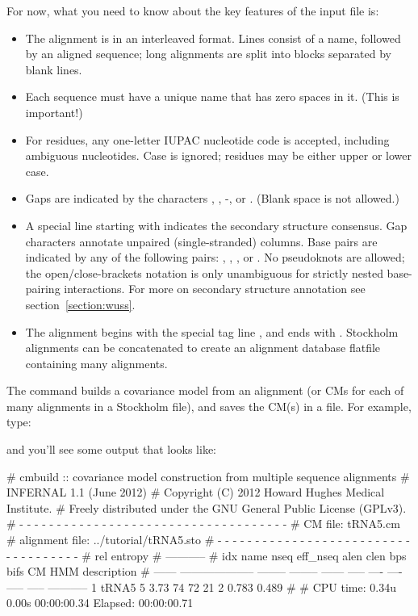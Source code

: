 For now, what you need to know about the key features of the input file is:
\begin{itemize}
\item The alignment is in an interleaved format.
Lines consist of a name, followed by an aligned sequence;
long alignments are split into blocks separated by blank lines.
\item Each sequence must have a unique name that has zero spaces in it. (This is important!)
\item For residues, any one-letter IUPAC nucleotide code is accepted,
      including ambiguous nucleotides. Case is ignored; residues
      may be either upper or lower case.
\item Gaps are indicated by the characters , \otext{\_}, -, or \otext{~}.
      (Blank space is not allowed.)
\item A special line starting with  indicates
      the secondary structure consensus. Gap characters annotate
      unpaired (single-stranded) columns. Base pairs are indicated
      by any of the following pairs: \otext{<>}, \otext{()}, \otext{[]},
      or \otext{[]}. No pseudoknots are allowed; the
      open/close-brackets notation is only unambiguous for strictly
      nested base-pairing interactions.
      For more on secondary structure annotation see
      section~\ref{section:wuss}.
\item The alignment begins with the special tag line
      , and ends with \otext{//}.
      Stockholm alignments
      can be concatenated to create an alignment database flatfile
      containing many alignments.
\end{itemize}

The  command builds a covariance model from an alignment (or
CMs for each of many alignments in a Stockholm file), and saves the
CM(s) in a file. For example, type:


and you'll see some output that looks like:

\begin{sreoutput}
# cmbuild :: covariance model construction from multiple sequence alignments
# INFERNAL 1.1 (June 2012)
# Copyright (C) 2012 Howard Hughes Medical Institute.
# Freely distributed under the GNU General Public License (GPLv3).
# - - - - - - - - - - - - - - - - - - - - - - - - - - - - - - - - - - - -
# CM file:                                            tRNA5.cm
# alignment file:                                     ../tutorial/tRNA5.sto
# - - - - - - - - - - - - - - - - - - - - - - - - - - - - - - - - - - - -
#                                                                      rel entropy
#                                                                      -----------
# idx    name                     nseq eff_nseq   alen  clen  bps bifs    CM   HMM description
# ------ -------------------- -------- -------- ------ ----- ---- ---- ----- ----- -----------
       1 tRNA5                       5     3.73     74    72   21    2 0.783 0.489 
#
# CPU time: 0.34u 0.00s 00:00:00.34 Elapsed: 00:00:00.71
\end{sreoutput}

